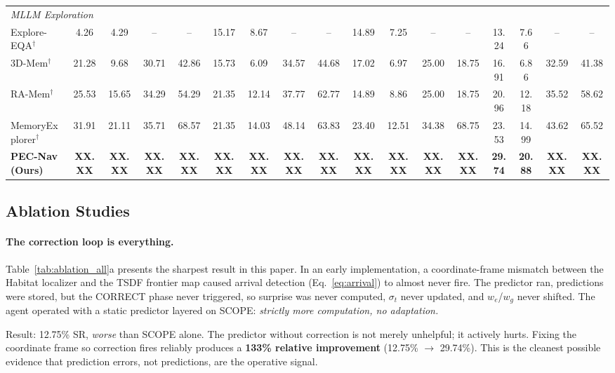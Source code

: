 \documentclass[10pt,twocolumn,letterpaper]{article}
\begin{document}
\begin{table}[t]
{\begin{tabular}{lcccccccccccccccc}
\midrule
\multicolumn{17}{l}{\emph{MLLM Exploration}} \\
Explore-EQA$^\dagger$~\cite{ren2024exploreeqa} & 4.26 & 4.29 & -- & -- & 15.17 & 8.67 & -- & -- & 14.89 & 7.25 & -- & -- & 13.24 & 7.66 & -- & -- \\
3D-Mem$^\dagger$~\cite{huang20243dmem} & 21.28 & 9.68 & 30.71 & 42.86 & 15.73 & 6.09 & 34.57 & 44.68 & 17.02 & 6.97 & 25.00 & 18.75 & 16.91 & 6.86 & 32.59 & 41.38 \\
RA-Mem$^\dagger$~\cite{yang2024ramem} & 25.53 & 15.65 & 34.29 & 54.29 & 21.35 & 12.14 & 37.77 & 62.77 & 14.89 & 8.86 & 25.00 & 18.75 & 20.96 & 12.18 & 35.52 & 58.62 \\
MemoryExplorer$^\dagger$~\cite{wang2026memoryexplorer} & 31.91 & 21.11 & 35.71 & 68.57 & 21.35 & 14.03 & 48.14 & 63.83 & 23.40 & 12.51 & 34.38 & 68.75 & 23.53 & 14.99 & 43.62 & 65.52 \\
\midrule
\textbf{PEC-Nav (Ours)} & \textbf{XX.XX} & \textbf{XX.XX} & \textbf{XX.XX} & \textbf{XX.XX} & \textbf{XX.XX} & \textbf{XX.XX} & \textbf{XX.XX} & \textbf{XX.XX} & \textbf{XX.XX} & \textbf{XX.XX} & \textbf{XX.XX} & \textbf{XX.XX} & \textbf{29.74} & \textbf{20.88} & \textbf{XX.XX} & \textbf{XX.XX} \\
\bottomrule
\end{tabular}%
}
\end{table}

\subsection{Ablation Studies}

\paragraph{The correction loop is everything.} Table~\ref{tab:ablation_all}a presents the sharpest result in this paper. In an early implementation, a coordinate-frame mismatch between the Habitat localizer and the TSDF frontier map caused arrival detection (Eq.~\ref{eq:arrival}) to almost never fire. The predictor ran, predictions were stored, but the CORRECT phase never triggered, so surprise was never computed, $\sigma_t$ never updated, and $w_e$/$w_g$ never shifted. The agent operated with a static predictor layered on SCOPE: \emph{strictly more computation, no adaptation.}

Result: 12.75\% SR, \emph{worse} than SCOPE alone. The predictor without correction is not merely unhelpful; it actively hurts. Fixing the coordinate frame so correction fires reliably produces a \textbf{133\% relative improvement} (12.75\% $\rightarrow$ 29.74\%). This is the cleanest possible evidence that prediction errors, not predictions, are the operative signal.
\end{document}
